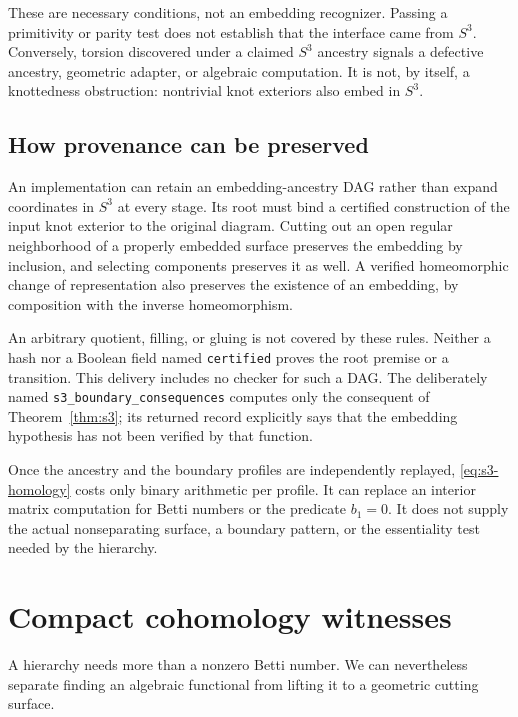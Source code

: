 \documentclass[11pt]{article}
\theoremstyle{definition}
\theoremstyle{remark}
\newcommand{\code}[1]{\texttt{#1}}
\begin{document}
These are necessary conditions, not an embedding recognizer. Passing a
primitivity or parity test does not establish that the interface came from
$S^3$. Conversely, torsion discovered under a claimed $S^3$ ancestry signals
a defective ancestry, geometric adapter, or algebraic computation. It is
not, by itself, a knottedness obstruction: nontrivial knot exteriors also
embed in $S^3$.

\subsection{How provenance can be preserved}
An implementation can retain an embedding-ancestry DAG rather than expand
coordinates in $S^3$ at every stage. Its root must bind a certified
construction of the input knot exterior to the original diagram. Cutting
out an open regular neighborhood of a properly embedded surface preserves
the embedding by inclusion, and selecting components preserves it as well.
A verified homeomorphic change of representation also preserves the
existence of an embedding, by composition with the inverse homeomorphism.

An arbitrary quotient, filling, or gluing is not covered by these rules.
Neither a hash nor a Boolean field named \code{certified} proves the root
premise or a transition. This delivery includes no checker for such a DAG.
The deliberately named \code{s3\_boundary\_consequences} computes only the
consequent of Theorem~\ref{thm:s3}; its returned record explicitly says that
the embedding hypothesis has not been verified by that function.

Once the ancestry and the boundary profiles are independently replayed,
\eqref{eq:s3-homology} costs only binary arithmetic per profile. It can
replace an interior matrix computation for Betti numbers or the predicate
$b_1=0$. It does not supply the actual nonseparating surface, a boundary
pattern, or the essentiality test needed by the hierarchy.

\section{Compact cohomology witnesses}
\label{sec:cohomology}

A hierarchy needs more than a nonzero Betti number. We can nevertheless
separate finding an algebraic functional from lifting it to a geometric
cutting surface.
\end{document}

